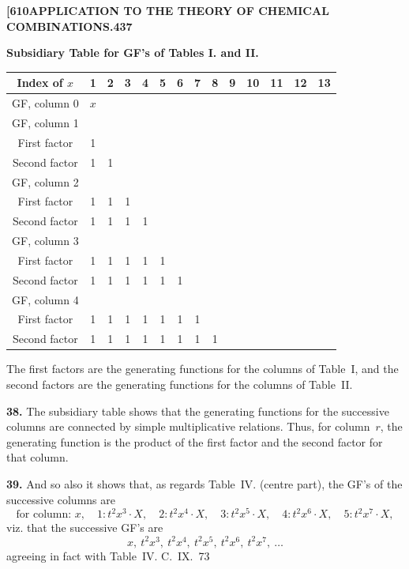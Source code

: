 \documentclass[11pt,a4paper]{book}
\begin{document}
{\newpage
\noindent\textbf{[610}\hspace{\fill}\textbf{APPLICATION TO THE THEORY OF CHEMICAL COMBINATIONS.}\hspace{\fill}\textbf{437}

\noindent\textbf{Subsidiary Table for GF's of Tables I. and II.}

\begin{center}
\small
\begin{tabular}{|c|c|c|c|c|c|c|c|c|c|c|c|c|c|}
\hline
Index of $x$ & 1 & 2 & 3 & 4 & 5 & 6 & 7 & 8 & 9 & 10 & 11 & 12 & 13 \\
\hline
GF, column 0 & $x$ & & & & & & & & & & & & \\
\hline
GF, column 1 & & & & & & & & & & & & & \\
First factor & 1 & & & & & & & & & & & & \\
Second factor & 1 & 1 & & & & & & & & & & & \\
\hline
GF, column 2 & & & & & & & & & & & & & \\
First factor & 1 & 1 & 1 & & & & & & & & & & \\
Second factor & 1 & 1 & 1 & 1 & & & & & & & & & \\
\hline
GF, column 3 & & & & & & & & & & & & & \\
First factor & 1 & 1 & 1 & 1 & 1 & & & & & & & & \\
Second factor & 1 & 1 & 1 & 1 & 1 & 1 & & & & & & & \\
\hline
GF, column 4 & & & & & & & & & & & & & \\
First factor & 1 & 1 & 1 & 1 & 1 & 1 & 1 & & & & & & \\
Second factor & 1 & 1 & 1 & 1 & 1 & 1 & 1 & 1 & & & & & \\
\hline
\end{tabular}
\end{center}

The first factors are the generating functions for the columns of Table~I, and the second factors are the generating functions for the columns of Table~II.

\medskip
\noindent\textbf{38.}
The subsidiary table shows that the generating functions for the successive columns are connected by simple multiplicative relations. Thus, for column~$r$, the generating function is the product of the first factor and the second factor for that column.

\medskip
\noindent\textbf{39.}
And so also it shows that, as regards Table~IV. (centre part), the GF's of the successive columns are
\[
\text{for column: } x,\quad 1: t^2x^3 \cdot X,\quad 2: t^2x^4 \cdot X,\quad 3: t^2x^5 \cdot X,\quad 4: t^2x^6 \cdot X,\quad 5: t^2x^7 \cdot X,
\]
viz. that the successive GF's are
\[
x,\ t^2x^3,\ t^2x^4,\ t^2x^5,\ t^2x^6,\ t^2x^7,\ \ldots
\]
agreeing in fact with Table~IV.
\hfill C.~IX.\ 73

}
\end{document}
